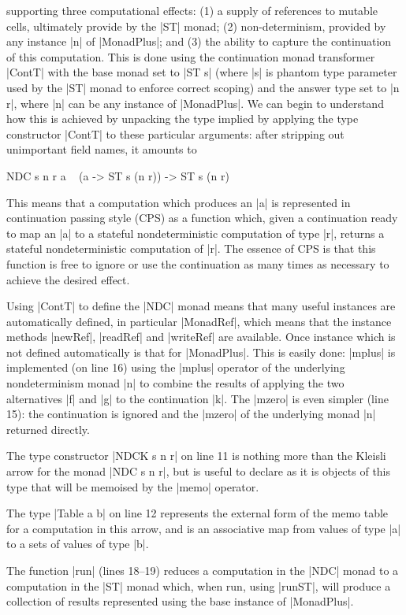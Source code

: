 \documentclass[a4paper,10pt]{article}
\begin{document}
supporting three computational effects: (1) a supply of references to mutable cells, ultimately provide
by the |ST| monad; (2) non-determinism, provided by any instance |n| of |MonadPlus|; and (3) the ability
to capture the continuation of this computation. This is done using the continuation monad transformer
|ContT| with the base monad set to |ST s| (where |s| is phantom type parameter used by the |ST| monad
to enforce correct scoping) and the answer type set to |n r|, where |n| can be any instance of |MonadPlus|.
We can begin to understand how this is achieved by unpacking the type implied by applying the type constructor
|ContT| to these particular arguments: after stripping out unimportant field names, it amounts to
\begin{hasklet}
	NDC s n r a ~ (a -> ST s (n r)) -> ST s (n r)
\end{hasklet}
This means that a computation which produces an |a| is represented in continuation passing style (CPS) as
a function which, given a continuation 
ready to map an |a| to a stateful nondeterministic computation of type |r|, returns a stateful nondeterministic computation of |r|.
The essence of CPS is that this function is free to ignore or use the continuation as many times as necessary to achieve the desired effect. 

Using |ContT| to define the |NDC| monad means that many useful instances are automatically defined, 
in particular |MonadRef|, which means that the instance methods |newRef|, |readRef| and |writeRef| 
are available. Once instance which is not defined automatically is that for |MonadPlus|. This is easily
done: |mplus| is implemented (on line 16) using the |mplus| operator of the underlying nondeterminism monad |n| to 
combine the results of applying the two alternatives |f| and |g| to the continuation |k|. The |mzero| is
even simpler (line 15): the continuation is ignored and the |mzero| of the underlying monad |n| returned directly.

The type constructor |NDCK s n r| on line 11 is nothing more than the Kleisli arrow for the monad |NDC s n r|,
but is useful to declare as it is objects of this type that will be memoised by the |memo| operator.

The type |Table a b| on line 12 represents the external form of the memo table for a computation in this arrow,
and is an associative map from values of type |a| to a sets of values of type |b|.

The function |run| (lines 18--19) reduces a computation in the |NDC| monad to a computation in the |ST| monad which,
when run, using |runST|, will produce a collection of results represented using the base instance of |MonadPlus|.
\end{document}
